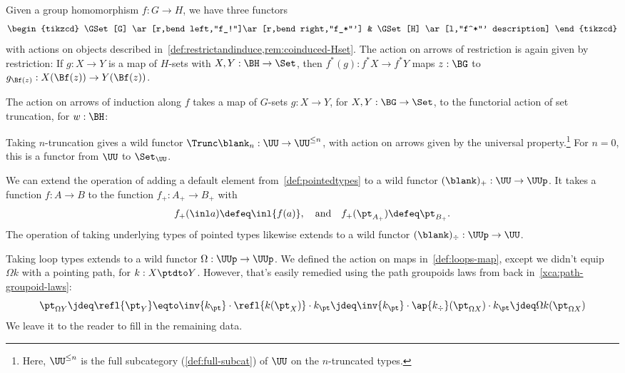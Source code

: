 \begin{example}\label{ex:action-functors}
  Given a group homomorphism $f : G \to H$,
  we have three functors
  \[
    \begin{tikzcd}
      \GSet[G] \ar[r,bend left,"f_!"]\ar[r,bend right,"f_*"'] &
      \GSet[H] \ar[l,"f^*"' description]
    \end{tikzcd}
  \]
  with actions on objects described in~\cref{def:restrictandinduce,rem:coinduced-Hset}.
  The action on arrows of restriction is again given by restriction:
  If $g : X \to Y$ is a map of $H$-sets with $X,Y:\BH \to \Set$,
  then $f^*(g) : f^*X \to f^*Y$ maps $z:\BG$ to $g_{\Bf(z)} : X(\Bf(z)) \to Y(\Bf(z))$.

  The action on arrows of induction along $f$ takes a map of $G$-sets $g : X \to Y$,
  for $X,Y : \BG\to\Set$,
  to the functorial action of set truncation, for $w:\BH$:
\end{example}
\begin{example}\label{def:n-trunc-functor}
  Taking $n$-truncation gives a wild functor
  $\Trunc\blank_n : \UU \to \UU^{\le n}$,
  with action on arrows given by the universal property.\footnote{%
    Here, $\UU^{\le n}$ is the full subcategory (\cref{def:full-subcat})
    of $\UU$ on the $n$-truncated types.}
  For $n=0$, this is a functor from $\UU$ to $\Set_\UU$.
\end{example}
\begin{example}\label{ex:add-remove-basepoint}
  We can extend the operation of adding a default element
  from~\cref{def:pointedtypes}
  to a wild functor $(\blank)_+ : \UU \to \UUp$.
  It takes a function $f : A \to B$
  to the function $f_+ : A_+ \to B_+$
  with
  \[
    f_+(\inl a) \defeq \inl{f(a)},\quad\text{and}\quad
    f_+(\pt_{A_+}) \defeq \pt_{B_+}.
  \]
  The operation of taking underlying types of pointed types
  likewise extends to a wild functor $(\blank)_\div : \UUp \to \UU$.
\end{example}
\begin{example}\label{ex:loop-functor}
  Taking loop types extends to a wild functor $\Omega : \UUp \to \UUp$.
  We defined the action on maps in~\cref{def:loops-map},
  except we didn't equip $\Omega k$ with a pointing path, for $k : X \ptdto Y$.
  However, that's easily remedied using the path groupoids
  laws from back in~\cref{xca:path-groupoid-laws}:
  \[
    \pt_{\Omega Y} \jdeq \refl{\pt_Y}
    \eqto \inv{k_\pt} \cdot \refl{k(\pt_X)} \cdot k_\pt
    \jdeq \inv{k_\pt} \cdot \ap{k_\div}(\pt_{\Omega X}) \cdot k_\pt
    \jdeq \Omega k(\pt_{\Omega X})
  \]
  We leave it to the reader to fill in the remaining data.
\end{example}
